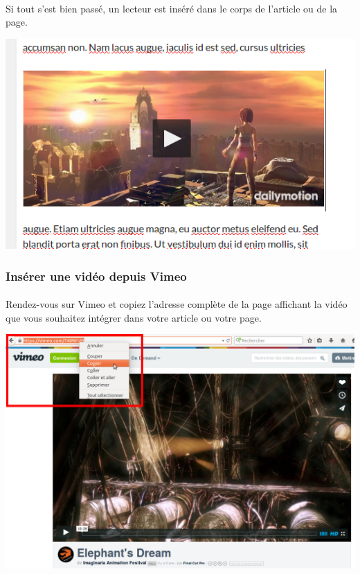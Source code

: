 \documentclass[10pt,a4paper]{article}
\begin{document}
\paragraph{}Si tout s'est bien passé, un lecteur est inséré dans le corps de l'article ou de la page.
\begin{center}
\includegraphics[scale=0.3]{img/0139.png}
\end{center}
\newpage
\subsubsection{Insérer une vidéo depuis Vimeo}
\paragraph{}Rendez-vous sur Vimeo et copiez l'adresse complète de la page affichant la vidéo que vous souhaitez intégrer dans votre article ou votre page.
\begin{center}
\includegraphics[scale=0.3]{img/0140.png}
\end{center}
\end{document}
